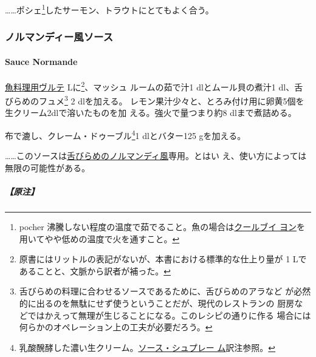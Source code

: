 \begin{recette}
\ldots{}\ldots{}ポシェ\footnote{pocher
  沸騰しない程度の温度で茹でること。魚の場合は\protect\hyperlink{}{クールブイ
  ヨン}を用いてやや低めの温度で火を通すこと。}したサーモン、トラウトにとてもよく合う。

\maeaki

\hypertarget{ux30ceux30ebux30deux30f3ux30c7ux30a3ux30fcux98a8ux30bdux30fcux30b9}{%
\subsubsection{ノルマンディー風ソース}\label{ux30ceux30ebux30deux30f3ux30c7ux30a3ux30fcux98a8ux30bdux30fcux30b9}}

\hypertarget{sauce-normande}{%
\paragraph{Sauce Normande}\label{sauce-normande}}


\protect\hyperlink{veloute-de-poisson}{魚料理用ヴルテ}\troisquarts{}
Lに\footnote{原書にはリットルの表記がないが、本書における標準的な仕上り量が
  1 Lであることと、文脈から訳者が補った。}、マッシュ ルームの茹で汁1
dlとムール貝の煮汁1 dl、舌びらめのフュメ\footnote{舌びらめの料理に合わせるソースであるために、舌びらめのアラなど
  が必然的に出るのを無駄にせず使うということだが、現代のレストランの
  厨房などではかえって無理が生じることになる。このレシピの通りに作る
  場合には何らかのオペレーション上の工夫が必要だろう。} 2 dlを加える。
レモン果汁少々と、とろみ付け用に卵黄5個を生クリーム2dlで溶いたものを加
える。強火で\deuxtiers{}量つまり約8 dlまで煮詰める。

布で漉し、クレーム・ドゥーブル\footnote{乳酸醗酵した濃い生クリーム。\protect\hyperlink{sauce-supreme}{ソース・シュプレー
  ム}訳注参照。}1 dlとバター125 gを加える。

\ldots{}\ldots{}このソースは\protect\hyperlink{sole-normande}{舌びらめのノルマンディ風}専用。とはい
え、使い方によっては無限の可能性がある。

\hypertarget{ux539fux6ce8-16}{%
\subparagraph{【原注】}\label{ux539fux6ce8-16}}


\end{recette}
